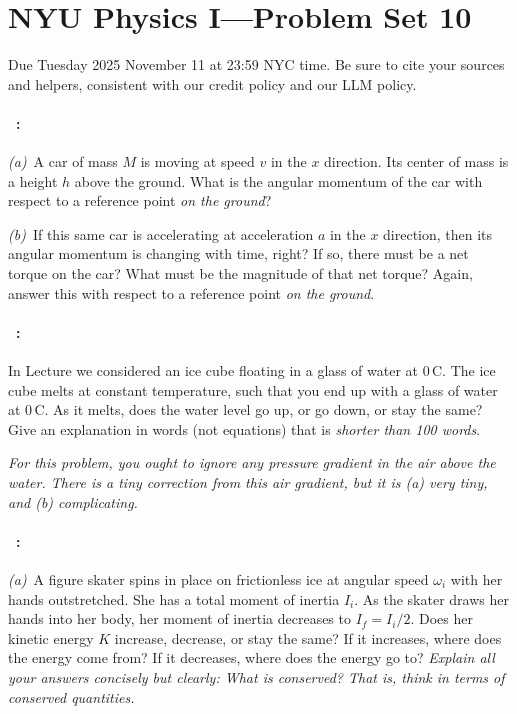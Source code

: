 \documentclass[12pt]{article}
\begin{document}
\section*{NYU Physics I---Problem Set 10}

Due Tuesday 2025 November 11 at 23:59 NYC time. Be sure to cite your sources and helpers,
consistent with our credit policy and our LLM policy.

\paragraph{\problemname~\theproblem:}\label{cartorque}%
\textsl{(a)}~A car of mass $M$ is moving at speed $v$ in the $x$
direction. Its center of mass is a height $h$ above the ground.  What
is the angular momentum of the car with respect to a reference point
\emph{on the ground}?

\textsl{(b)}~If this same car is accelerating at acceleration $a$
in the $x$ direction, then its angular momentum is changing with time,
right? If so, there must be a net torque on the car? What must be
the magnitude of that net torque? Again, answer this with respect
to a reference point \emph{on the ground}.

\paragraph{\problemname~\theproblem:}\label{icecube}%
In Lecture we considered an ice cube floating in a glass of water at
0\,C.  The ice cube melts at constant temperature, such that you end
up with a glass of water at 0\,C. As it melts, does the water level go
up, or go down, or stay the same? Give an explanation in words (not
equations) that is \emph{shorter than 100 words}.

\textsl{For this problem, you ought to ignore any pressure gradient in
  the air above the water. There is a tiny correction from this air
  gradient, but it is (a) very tiny, and (b) complicating.}

\paragraph{\problemname~\theproblem:}%
\textsl{(a)}~A figure skater spins in place on frictionless ice at
angular speed $\omega_i$ with her hands outstretched.  She has a total
moment of inertia $I_i$.  As the skater draws her hands into her body,
her moment of inertia decreases to $I_f=I_i/2$.  Does her kinetic
energy $K$ increase, decrease, or stay the same?  If it increases,
where does the energy come from?  If it decreases, where does the
energy go to?  \emph{Explain all your answers concisely but clearly:
What is conserved? That is, think in terms of conserved quantities.}
\end{document}
